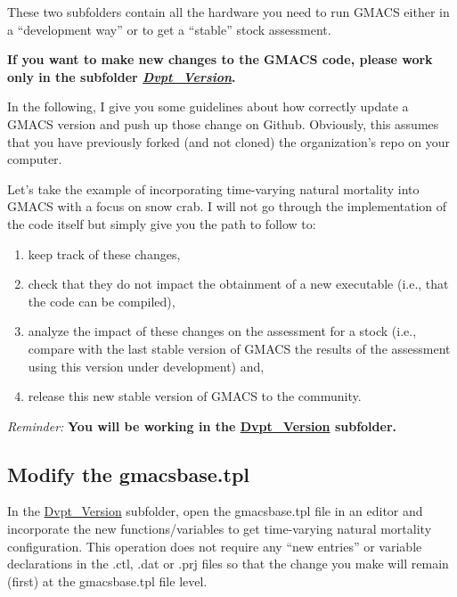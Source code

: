 \documentclass[
]{article}
\providecommand{\tightlist}{%
  \setlength{\itemsep}{0pt}\setlength{\parskip}{0pt}}
\begin{document}
These two subfolders contain all the hardware you need to run GMACS
either in a ``development way'' or to get a ``stable'' stock assessment.

\textbf{If you want to make new changes to the GMACS code, please work
only in the subfolder
\emph{\href{https://github.com/GMACS-project/GMACS_Assessment_code/tree/main/GMACS/Dvpt_Version}{Dvpt\_Version}}.}

In the following, I give you some guidelines about how correctly update
a GMACS version and push up those change on Github. Obviously, this
assumes that you have previously forked (and not cloned) the
organization's repo on your computer.

Let's take the example of incorporating time-varying natural mortality
into GMACS with a focus on snow crab. I will not go through the
implementation of the code itself but simply give you the path to follow
to:

\begin{enumerate}
\def\labelenumi{\roman{enumi}.}
\tightlist
\item
  keep track of these changes,
\item
  check that they do not impact the obtainment of a new executable
  (i.e., that the code can be compiled),
\item
  analyze the impact of these changes on the assessment for a stock
  (i.e., compare with the last stable version of GMACS the results of
  the assessment using this version under development) and,
\item
  release this new stable version of GMACS to the community.
\end{enumerate}

\emph{Reminder:} \textbf{You will be working in the
\href{https://github.com/GMACS-project/GMACS_Assessment_code/tree/main/GMACS/Dvpt_Version}{Dvpt\_Version}
subfolder.}

\hypertarget{modify-the-gmacsbase.tpl}{%
\subsection{Modify the gmacsbase.tpl}\label{modify-the-gmacsbase.tpl}}

In the
\href{https://github.com/GMACS-project/GMACS_Assessment_code/tree/main/GMACS/Dvpt_Version}{Dvpt\_Version}
subfolder, open the gmacsbase.tpl file in an editor and incorporate the
new functions/variables to get time-varying natural mortality
configuration. This operation does not require any ``new entries'' or
variable declarations in the .ctl, .dat or .prj files so that the change
you make will remain (first) at the gmacsbase.tpl file level.
\end{document}
